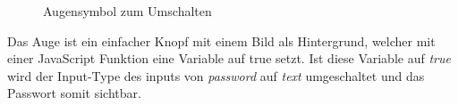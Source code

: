 \begin{figure}[H]
    \begin{center}
      \caption{Augensymbol zum Umschalten}
    \end{center}
\end{figure}

Das Auge ist ein einfacher Knopf mit einem Bild als Hintergrund, welcher mit einer JavaScript Funktion 
eine Variable auf true setzt. Ist diese Variable auf \textit{true} wird der Input-Type des inputs von
\textit{password} auf \textit{text} umgeschaltet und das Passwort somit sichtbar. 
